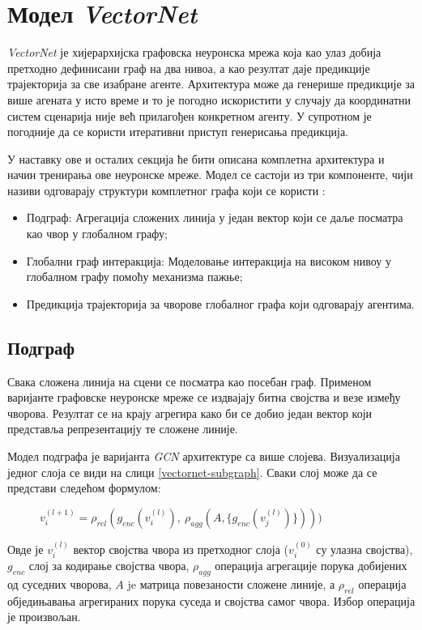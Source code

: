 \documentclass[11pt,oneside]{memoir}
\begin{document}
\section{Модел \textit{VectorNet}}

\textit{VectorNet} је хијерархијска графовска неуронска мрежа која као улаз добија претходно дефинисани граф на два нивоа, а као резултат
даје предикције трајекторија за све изабране агенте. Архитектура може да генерише предикције за више агената у исто време и то
је погодно искористити у случају да координатни систем сценарија није већ прилагођен конкретном агенту. У супротном је погодније
да се користи итеративни приступ генерисања предикција. 

У наставку ове и осталих секција ће бити описана комплетна архитектура и начин тренирања ове неуронске мреже. Модел се састоји из три компоненте,
чији називи одговарају структури комплетног графа који се користи \cite{vectornet}:
\begin{itemize}
  \item Подграф: Агрегација сложених линија у један вектор који се даље посматра као чвор у глобалном графу;
  \item Глобални граф интеракција: Моделовање интеракција на високом нивоу у глобалном графу помоћу механизма пажње;
  \item Предикција трајекторија за чворове глобалног графа који одговарају агентима.
\end{itemize}

\subsection{Подграф}

Свака сложена линија на сцени се посматра као посебан граф. Применом варијанте графовске неуронске мреже
се издвајају битна својства и везе између чворова. Резултат се на крају агрегира како би се добио један вектор који представља репрезентацију
те сложене линије.

Модел подграфа је варијанта \textit{GCN} архитектуре \cite{gcn} са више слојева. Визуализација једног слоја се види на слици \ref{vectornet-subgraph}. 
Сваки слој може да се представи следећом формулом:

\begin{figure}[H]
  \centering
  $v^{(l+1)}_{i} = \rho_{rel}(g_{enc}(v^{(l)}_{i}),\ \rho_{agg}(A, \{g_{enc}(v^{(l)}_{j})\})))$
\end{figure}

Овде је $v^{(l)}_{i}$ вектор својства чвора из претходног слоја ($v^{(0)}_{i}$ су улазна својства), $g_{enc}$ слој за кодирање својства чвора, 
$\rho_{agg}$ операција агрегације порука добијених од суседних чворова, $A$ je матрица повезаности сложене линије, 
а $\rho_{rel}$ операција обједињавања агрегираних порука суседа и својства самог чвора. Избор операција је произвољан.
\end{document}
